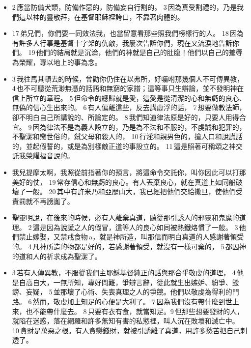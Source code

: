   \begin{itemize}
 \itemsep-.25em
\item  2 應當防備犬類，防備作惡的，防備妄自行割的。 3 因為真受割禮的，乃是我們這以神的靈敬拜，在基督耶穌裡誇口，不靠著肉體的。
 \item 17 弟兄們，你們要一同效法我，也當留意看那些照我們榜樣行的人。 18 因為有許多人行事是基督十字架的仇敵，我屢次告訴你們，現在又流淚地告訴你們。 19 他們的結局就是沉淪，他們的神就是自己的肚腹！他們以自己的羞辱為榮耀，專以地上的事為念。
 \end{itemize}
 
  \begin{itemize}
 \itemsep-.25em
\item 3 我往馬其頓去的時候，曾勸你仍住在以弗所，好囑咐那幾個人不可傳異教， 4 也不可聽從荒渺無憑的話語和無窮的家譜；這等事只生辯論，並不發明神在信上所立的章程。 5 但命令的總歸就是愛，這愛是從清潔的心和無虧的良心、無偽的信心生出來的。 6 有人偏離這些，反去講虛浮的話， 7 想要做教法師，卻不明白自己所講說的、所論定的。 8 我們知道律法原是好的，只要人用得合宜。 9 因為律法不是為義人設立的，乃是為不法和不服的，不虔誠和犯罪的，不聖潔和戀世俗的，弑父母和殺人的， 10 行淫和親男色的，搶人口和說謊話的，並起假誓的，或是為別樣敵正道的事設立的。 11 這是照著可稱頌之神交託我榮耀福音說的。
 \item  我兒提摩太啊，我照從前指著你的預言，將這命令交託你，叫你因此可以打那美好的仗， 19 常存信心和無虧的良心。有人丟棄良心，就在真道上如同船破壞了一般。 20 其中有許米乃和亞歷山大，我已經把他們交給撒旦，使他們受責罰就不再謗讟了。
  \item 聖靈明說，在後來的時候，必有人離棄真道，聽從那引誘人的邪靈和鬼魔的道理。 2 這是因為說謊之人的假冒，這等人的良心如同被熱鐵烙慣了一般。 3 他們禁止嫁娶，又禁戒食物 a，就是神所造，叫那信而明白真道的人感謝著領受的。 4 凡神所造的物都是好的，若感謝著領受，就沒有一樣可棄的， 5 都因神的道和人的祈求成為聖潔了。
 \item  3 若有人傳異教，不服從我們主耶穌基督純正的話與那合乎敬虔的道理， 4 他是自高自大，一無所知，專好問難，爭辯言辭，從此就生出嫉妒、紛爭、毀謗、妄疑， 5 並那壞了心術、失喪真理之人的爭競。他們以敬虔為得利的門路。 6 然而，敬虔加上知足的心便是大利了。 7 因為我們沒有帶什麼到世上來，也不能帶什麼去。 8 只要有衣有食，就當知足。9 但那些想要發財的人，就陷在迷惑，落在網羅和許多無知有害的私慾裡，叫人沉在敗壞和滅亡中。 10 貪財是萬惡之根。有人貪戀錢財，就被引誘離了真道，用許多愁苦把自己刺透了。
 \end{itemize}
    
